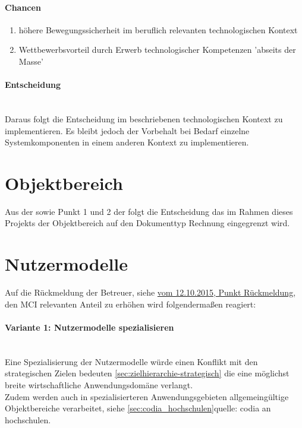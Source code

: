 \paragraph{Chancen}

\begin{enumerate}
\item höhere Bewegungssicherheit im beruflich relevanten technologischen Kontext
\item Wettbewerbsvorteil durch Erwerb technologischer Kompetenzen 'abseits der Masse'
\end{enumerate}

\paragraph{Entscheidung}\\
Daraus folgt die Entscheidung im beschriebenen technologischen Kontext zu implementieren. Es bleibt jedoch der Vorbehalt 
bei Bedarf einzelne Systemkomponenten in einem anderen Kontext zu implementieren.
%
%
\section{Objektbereich}
Aus der  sowie Punkt 1 und 2 der  folgt
die Entscheidung das im Rahmen dieses Projekts der Objektbereich auf den Dokumenttyp Rechnung eingegrenzt wird.


\section{Nutzermodelle}
Auf die Rückmeldung der Betreuer, siehe \href{https://github.com/thuascgn/EISWS1516Howe/blob/master/MS1/Sprechstunde_MS1_20151012.md}{vom 12.10.2015, Punkt Rückmeldung}, den MCI relevanten Anteil zu erhöhen wird folgendermaßen reagiert:

%
\paragraph*{Variante 1: Nutzermodelle spezialisieren}\\
Eine Spezialisierung der Nutzermodelle würde einen Konflikt mit den strategischen Zielen bedeuten \ref{sec:zielhierarchie-strategisch} die eine möglichst breite wirtschaftliche Anwendungsdomäne verlangt.\\
Zudem werden auch in spezialisierteren Anwendungsgebieten allgemeingültige Objektbereiche verarbeitet, siehe \ref{sec:codia_hochschulen}{quelle: codia an hochschulen}.

